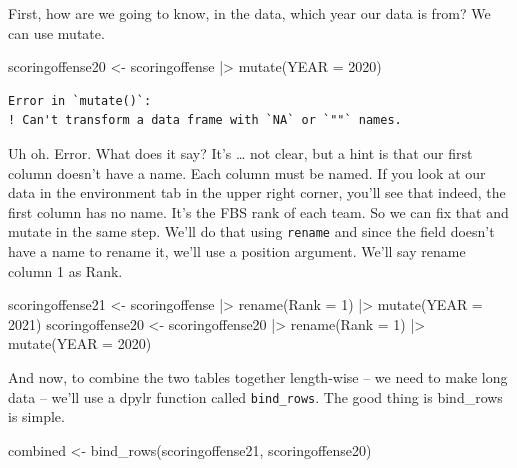 \documentclass[
  letterpaper,
  DIV=11,
  numbers=noendperiod]{scrreprt}
\newenvironment{Shaded}{\begin{snugshade}}{\end{snugshade}}
\newcommand{\AttributeTok}[1]{\textcolor[rgb]{0.40,0.45,0.13}{#1}}
\newcommand{\DecValTok}[1]{\textcolor[rgb]{0.68,0.00,0.00}{#1}}
\newcommand{\FunctionTok}[1]{\textcolor[rgb]{0.28,0.35,0.67}{#1}}
\newcommand{\NormalTok}[1]{\textcolor[rgb]{0.00,0.23,0.31}{#1}}
\newcommand{\OtherTok}[1]{\textcolor[rgb]{0.00,0.23,0.31}{#1}}
\newcommand{\SpecialCharTok}[1]{\textcolor[rgb]{0.37,0.37,0.37}{#1}}
\begin{document}
First, how are we going to know, in the data, which year our data is
from? We can use mutate.

\begin{Shaded}
\begin{Highlighting}[]
\NormalTok{scoringoffense20 }\OtherTok{\textless{}{-}}\NormalTok{ scoringoffense }\SpecialCharTok{|\textgreater{}} \FunctionTok{mutate}\NormalTok{(}\AttributeTok{YEAR =} \DecValTok{2020}\NormalTok{)}
\end{Highlighting}
\end{Shaded}

\begin{verbatim}
Error in `mutate()`:
! Can't transform a data frame with `NA` or `""` names.
\end{verbatim}

Uh oh. Error. What does it say? It's \ldots{} not clear, but a hint is
that our first column doesn't have a name. Each column must be named. If
you look at our data in the environment tab in the upper right corner,
you'll see that indeed, the first column has no name. It's the FBS rank
of each team. So we can fix that and mutate in the same step. We'll do
that using \texttt{rename} and since the field doesn't have a name to
rename it, we'll use a position argument. We'll say rename column 1 as
Rank.

\begin{Shaded}
\begin{Highlighting}[]
\NormalTok{scoringoffense21 }\OtherTok{\textless{}{-}}\NormalTok{ scoringoffense }\SpecialCharTok{|\textgreater{}} \FunctionTok{rename}\NormalTok{(}\AttributeTok{Rank =} \DecValTok{1}\NormalTok{) }\SpecialCharTok{|\textgreater{}} \FunctionTok{mutate}\NormalTok{(}\AttributeTok{YEAR =} \DecValTok{2021}\NormalTok{)}
\NormalTok{scoringoffense20 }\OtherTok{\textless{}{-}}\NormalTok{ scoringoffense20 }\SpecialCharTok{|\textgreater{}} \FunctionTok{rename}\NormalTok{(}\AttributeTok{Rank =} \DecValTok{1}\NormalTok{) }\SpecialCharTok{|\textgreater{}} \FunctionTok{mutate}\NormalTok{(}\AttributeTok{YEAR =} \DecValTok{2020}\NormalTok{)}
\end{Highlighting}
\end{Shaded}

And now, to combine the two tables together length-wise -- we need to
make long data -- we'll use a dpylr function called \texttt{bind\_rows}.
The good thing is bind\_rows is simple.

\begin{Shaded}
\begin{Highlighting}[]
\NormalTok{combined }\OtherTok{\textless{}{-}} \FunctionTok{bind\_rows}\NormalTok{(scoringoffense21, scoringoffense20)}
\end{Highlighting}
\end{Shaded}
\end{document}
